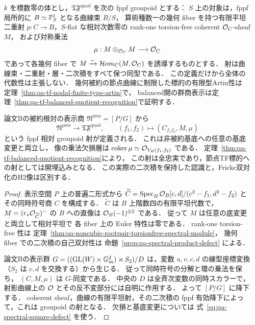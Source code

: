 \begin{proposition}
\label{prop:qa-spectral-quadratic-stack-map}
$k$ を標数零の体とし，$\mathfrak{TF}^{\mathrm{quad}}$
を次の fppf groupoid とする：
$S$ 上の対象は，fppf 局所的に
$B\simeq\mathbb P^1_S$ となる曲線束 $B/S$，
算術種数一の幾何 fiber を持つ有限平坦二重射
$p:C\to B$，$S$-flat な相対次数零の rank-one
torsion-free coherent $\mathcal O_C$-sheaf $M$，
および対称乗法
\[
 \mu:M\otimes_{\mathcal O_C} M\longrightarrow\mathcal O_C
\]
であって各幾何 fiber で
$M\xrightarrow{\sim}\mathcal H om_C(M,\mathcal O_C)$
を誘導するものとする．
射は曲線束・二重射・層・二次積をすべて保つ同型である．
この定義だけから全体の代数性は主張しない．
幾何被約の節点曲線に制限した標的の有限型Artin性は
定理~\ref{thm:qa-tf-nodal-finite-type-artin}で，
balanced開の群商表示は定理~\ref{thm:qa-tf-balanced-quotient-recognition}で証明する．

論文Bの被約根対の表示商
$\mathfrak N^{\mathrm{pres}}=[P/G]$ から
\[
 \mathfrak N^{\mathrm{pres}}
       \longrightarrow\mathfrak{TF}^{\mathrm{quad}},
 \qquad (f_1,f_2)\longmapsto(C_{f_1f_2},M,\mu)
 \tag{Quad-spectral}\label{eq:qa-spectral-quadratic-stack-map}
\]
という fppf 相対 groupoid 射が定義される．
これは非被約基底への任意の基底変更と両立し，
像の乗法欠損層は
$\operatorname{coker}\mu\simeq\mathcal O_{V_B(f_1,f_2)}$ である．
定理~\ref{thm:qa-tf-balanced-quotient-recognition}により，
この射は全忠実であり，節点TF標的への射としては開埋込みとなる．
この実際の二次積を保持した認識と，Fricke双対化のH2像は区別する．
\end{proposition}
\begin{proof}
表示空間 $P$ 上の普遍二形式から
$\widetilde C=\operatorname{Spec}_B\mathcal O_B[c,d]/(c^2-f_1,d^2-f_2)$
とその同時符号商 $C$ を構成する．
$\widetilde C$ は $B$ 上階数四の有限平坦代数で，
$M=(r_*\mathcal O_{\widetilde C})^-$ の $B$ への直像は
$\mathcal O_B(-1)^{\oplus2}$ である．
従って $M$ は任意の底変更と両立して相対平坦で
各 fiber 上の Euler 特性は零である．
rank-one torsion-free 性は
定理~\ref{thm:qa-noncubic-rootpair-torsionfree-spectral-module}，
幾何 fiber での二次積の自己双対性は
命題~\ref{prop:qa-spectral-product-defect} による．

論文Bの表示群
$G=((\operatorname{GL}(W)\times\mathbb G_m^2)\rtimes S_2)/D$
は，変数 $u,v,c,d$ の線型座標変換
（$S_2$ は $c,d$ を交換する）から生じる．
従って同時符号の分解と環の乗法を保ち，
$(C,M,\mu)$ は $G$-同変である．
中央の $D$ は全斉次変数の同時スカラーで，
射影曲線上の $\mathcal O$ とその反不変部分には自明に作用する．
よって $[P/G]$ に降下する．
coherent sheaf，曲線の有限平坦射，その二次積の
fppf 有効降下によって，これは groupoid の射となる．
欠損と基底変更については
式~\eqref{eq:qa-spectral-square-defect} を使う．
\end{proof}

